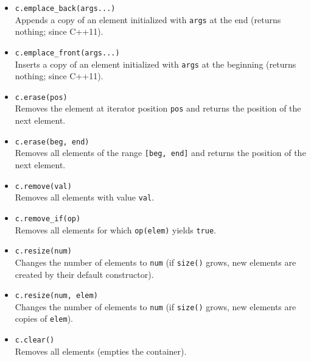 \documentclass{report}
\begin{document}
\begin{itemize}
    \item \texttt{c.emplace\_back(args...)} \\
    Appends a copy of an element initialized with \texttt{args} at the end (returns nothing; since C++11).
    
    \item \texttt{c.emplace\_front(args...)} \\
    Inserts a copy of an element initialized with \texttt{args} at the beginning (returns nothing; since C++11).
    
    \item \texttt{c.erase(pos)} \\
    Removes the element at iterator position \texttt{pos} and returns the position of the next element.
    
    \item \texttt{c.erase(beg, end)} \\
    Removes all elements of the range \texttt{[beg, end]} and returns the position of the next element.
    
    \item \texttt{c.remove(val)} \\
    Removes all elements with value \texttt{val}.
    
    \item \texttt{c.remove\_if(op)} \\
    Removes all elements for which \texttt{op(elem)} yields \texttt{true}.
    
    \item \texttt{c.resize(num)} \\
    Changes the number of elements to \texttt{num} (if \texttt{size()} grows, new elements are created by their default constructor).
    
    \item \texttt{c.resize(num, elem)} \\
    Changes the number of elements to \texttt{num} (if \texttt{size()} grows, new elements are copies of \texttt{elem}).
    
    \item \texttt{c.clear()} \\
    Removes all elements (empties the container).
\end{itemize}

\pagebreak 
\end{document}
